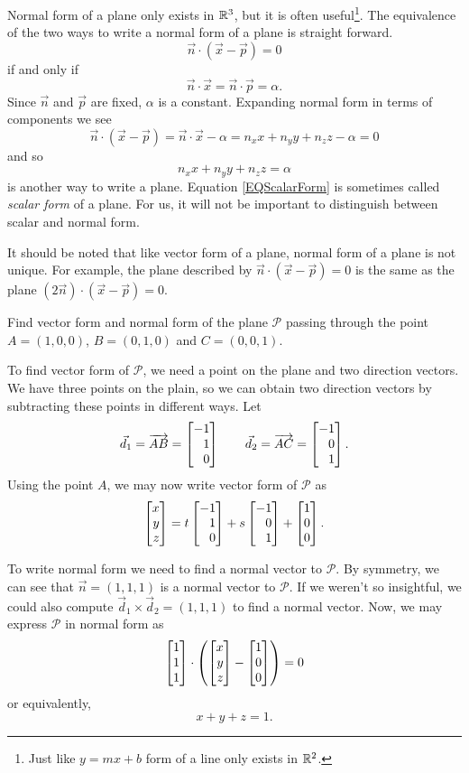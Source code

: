 Normal form of a plane only exists in $\mathbb{R}^3$, but it is often useful\footnote{ Just like $y=mx+b$ form
of a line only exists in $\mathbb{R}^2$.}.  The equivalence of the two ways to write a normal form of a plane
is straight forward.
\[
		\vec n\cdot(\vec x-\vec p)=0
\]
if and only if
\[
		\vec n\cdot\vec x = \vec n\cdot \vec p = \alpha.
\]
Since $\vec n$ and $\vec p$ are fixed, $\alpha$ is a constant. Expanding normal form in terms of
components we see
\[
		\vec n\cdot(\vec x-\vec p)=\vec n\cdot\vec x-\alpha=
		n_xx+n_yy+n_zz-\alpha=0
\]
and so
\begin{equation}
	\label{EQScalarForm}
		n_xx+n_yy+n_zz=\alpha
\end{equation}
is another way to write a plane.  Equation \eqref{EQScalarForm} is sometimes 
called \emph{scalar form}
of a plane.  For us, it will not be important to distinguish between scalar and normal form.

It should be noted that like vector form of a plane, normal form of a plane is not unique.
For example, the plane described by $\vec n\cdot(\vec x-\vec p)=0$ is the same as the 
plane $(2\vec n)\cdot(\vec x-\vec p)=0$.

\begin{example}
	Find vector form and normal form of the plane $\mathcal P$ passing
	through the point $A=(1,0,0)$, $B=(0,1,0)$ and $C=(0,0,1)$.

	To find vector form of $\mathcal P$, we need a point on the plane and
	two direction vectors.  We have three points on the plain, so we can
	obtain two direction vectors by subtracting these points in different ways.
	Let 
	\[
		\vec d_1=\overrightarrow{AB} = \mat{-1\\1\\0}\qquad\vec d_2=\overrightarrow{AC}=
		\mat{-1\\0\\1}.
	\]
	Using the point $A$, we may now write vector form of $\mathcal P$ as
	\[
		\mat{x\\y\\z} = t\mat{-1\\1\\0}+s\mat{-1\\0\\1}+\mat{1\\0\\0}.
	\]

	To write normal form we need to find a normal vector to $\mathcal P$.  By symmetry,
	we can see that $\vec n=(1,1,1)$ is a normal vector to $\mathcal P$.  If we weren't
	so insightful, we could also compute $\vec d_1\times \vec d_2 = (1,1,1)$ to find a
	normal vector.  Now, we may express $\mathcal P$ in normal form as
	\[
		\mat{1\\1\\1}\cdot\left(\mat{x\\y\\z}-\mat{1\\0\\0}\right)=0
	\]
	or equivalently,
	\[
		x+y+z=1.
	\]
\end{example}

